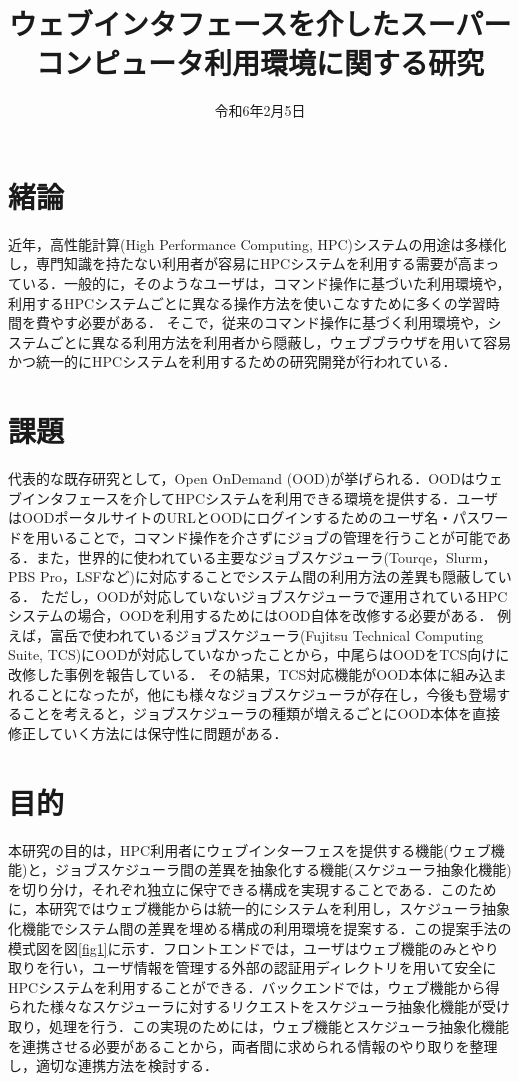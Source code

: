 \documentclass[a4paper,oneside,twocolumn,notitlepage,dvipdfmx]{jsarticle}
\date{令和6年2月5日}
\title{ウェブインタフェースを介したスーパーコンピュータ利用環境に関する研究}
\begin{document}
\maketitle
\section{緒論}
近年，高性能計算(High Performance Computing, HPC)システムの用途は多様化し，専門知識を持たない利用者が容易にHPCシステムを利用する需要が高まっている．一般的に，そのようなユーザは，コマンド操作に基づいた利用環境や，利用するHPCシステムごとに異なる操作方法を使いこなすために多くの学習時間を費やす必要がある．
そこで，従来のコマンド操作に基づく利用環境や，システムごとに異なる利用方法を利用者から隠蔽し，ウェブブラウザを用いて容易かつ統一的にHPCシステムを利用するための研究開発が行われている．\par

\vspace{3\baselineskip}
\section{課題}
代表的な既存研究として，Open OnDemand (OOD)が挙げられる\cite{citation_2}．OODはウェブインタフェースを介してHPCシステムを利用できる環境を提供する．ユーザはOODポータルサイトのURLとOODにログインするためのユーザ名・パスワードを用いることで，コマンド操作を介さずにジョブの管理を行うことが可能である．また，世界的に使われている主要なジョブスケジューラ(Tourqe，Slurm，PBS Pro，LSFなど)に対応することでシステム間の利用方法の差異も隠蔽している．
ただし，OODが対応していないジョブスケジューラで運用されているHPCシステムの場合，OODを利用するためにはOOD自体を改修する必要がある．
例えば，富岳で使われているジョブスケジューラ(Fujitsu Technical Computing Suite, TCS)にOODが対応していなかったことから，中尾らはOODをTCS向けに改修した事例を報告している\cite{citation_1}．
その結果，TCS対応機能がOOD本体に組み込まれることになったが，他にも様々なジョブスケジューラが存在し，今後も登場することを考えると，ジョブスケジューラの種類が増えるごとにOOD本体を直接修正していく方法には保守性に問題がある．\par

\vspace{3\baselineskip}
\section{目的}
本研究の目的は，HPC利用者にウェブインターフェスを提供する機能(ウェブ機能)と，ジョブスケジューラ間の差異を抽象化する機能(スケジューラ抽象化機能)を切り分け，それぞれ独立に保守できる構成を実現することである．このために，本研究ではウェブ機能からは統一的にシステムを利用し，スケジューラ抽象化機能でシステム間の差異を埋める構成の利用環境を提案する．この提案手法の模式図を図\ref{fig1}に示す．フロントエンドでは，ユーザはウェブ機能のみとやり取りを行い，ユーザ情報を管理する外部の認証用ディレクトリを用いて安全にHPCシステムを利用することができる．バックエンドでは，ウェブ機能から得られた様々なスケジューラに対するリクエストをスケジューラ抽象化機能が受け取り，処理を行う．この実現のためには，ウェブ機能とスケジューラ抽象化機能を連携させる必要があることから，両者間に求められる情報のやり取りを整理し，適切な連携方法を検討する．\par
\end{document}
